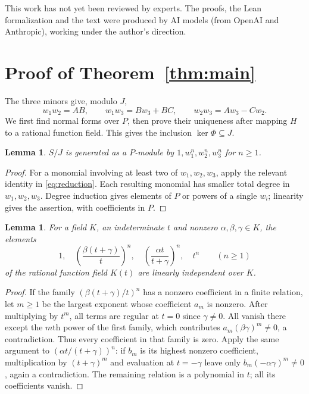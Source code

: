 \documentclass[11pt]{article}
\newtheorem{lemma}[theorem]{Lemma}
\theoremstyle{remark}
\begin{document}
This work has not yet been reviewed by experts.
The proofs, the Lean formalization and the text were produced by AI models
(from OpenAI and Anthropic), working under the author's direction.

\section{Proof of Theorem~\ref{thm:main}}
The three minors give, modulo $J$,
\begin{equation}\label{eq:reduction}
 w_1w_2=AB,\qquad w_1w_3=Bw_3+BC,\qquad w_2w_3=Aw_3-Cw_2.
\end{equation}
We first find normal forms over $P$, then prove their uniqueness after
mapping $H$ to a rational function field. This gives the inclusion
$\ker\Phi\subseteq J$.

\begin{lemma}\label{lem:normal}
$S/J$ is generated as a $P$-module by
$1,w_1^n,w_2^n,w_3^n$ for $n\ge1$.
\end{lemma}
\begin{proof}
For a monomial involving at least two of $w_1,w_2,w_3$, apply the relevant
identity in \eqref{eq:reduction}. Each resulting monomial has smaller total
degree in $w_1,w_2,w_3$. Degree induction gives elements of $P$ or powers of a single $w_i$;
linearity gives the assertion, with coefficients in $P$.
\end{proof}

\begin{lemma}\label{lem:independent}
For a field $K$, an indeterminate $t$ and nonzero $\alpha,\beta,\gamma\in K$, the elements
\[
 1,\quad \left(\frac{\beta(t+\gamma)}t\right)^n,\quad
 \left(\frac{\alpha t}{t+\gamma}\right)^n,\quad t^n\qquad(n\ge1)
\]
of the rational function field $K(t)$ are linearly independent over $K$.
\end{lemma}
\begin{proof}
If the family $(\beta(t+\gamma)/t)^n$ has a nonzero coefficient in a finite relation, let
$m\ge1$ be the largest exponent whose coefficient $a_m$ is nonzero.
After multiplying by $t^m$, all terms are regular at $t=0$ since $\gamma\ne0$.
All vanish there except the $m$th power of the first family, which
contributes $a_m(\beta\gamma)^m\ne0$, a contradiction. Thus every coefficient in
that family is zero. Apply the same argument to $(\alpha t/(t+\gamma))^n$:
if $b_m$ is its highest nonzero coefficient, multiplication by $(t+\gamma)^m$
and evaluation at $t=-\gamma$ leave only $b_m(-\alpha\gamma)^m\ne0$, again a contradiction.
The remaining relation is a polynomial in $t$; all its coefficients
vanish.
\end{proof}
\end{document}
